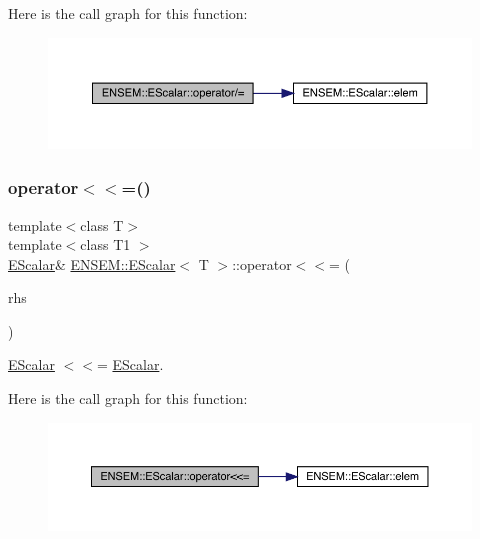 Here is the call graph for this function\+:
\nopagebreak
\begin{figure}[H]
\begin{center}
\leavevmode
\includegraphics[width=350pt]{d0/d82/classENSEM_1_1EScalar_a09524cf0f6f5baf9c421d03df58fe8d6_cgraph}
\end{center}
\end{figure}
\mbox{\label{classENSEM_1_1EScalar_a29ea96dc5698e4541307d65a0f1dfe6e}} 
\subsubsection{\texorpdfstring{operator$<$$<$=()}{operator<<=()}\hspace{0.1cm}{\footnotesize\ttfamily [1/2]}}
{\footnotesize\ttfamily template$<$class T$>$ \\
template$<$class T1 $>$ \\
\mbox{\hyperlink{classENSEM_1_1EScalar}{E\+Scalar}}\& \mbox{\hyperlink{classENSEM_1_1EScalar}{E\+N\+S\+E\+M\+::\+E\+Scalar}}$<$ T $>$\+::operator$<$$<$= (\begin{DoxyParamCaption}\item[{const \mbox{\hyperlink{classENSEM_1_1EScalar}{E\+Scalar}}$<$ T1 $>$ \&}]{rhs }\end{DoxyParamCaption})\hspace{0.3cm}{\ttfamily [inline]}}



\mbox{\hyperlink{classENSEM_1_1EScalar}{E\+Scalar}} $<$$<$= \mbox{\hyperlink{classENSEM_1_1EScalar}{E\+Scalar}}. 

Here is the call graph for this function\+:
\nopagebreak
\begin{figure}[H]
\begin{center}
\leavevmode
\includegraphics[width=350pt]{d0/d82/classENSEM_1_1EScalar_a29ea96dc5698e4541307d65a0f1dfe6e_cgraph}
\end{center}
\end{figure}
\mbox{\label{classENSEM_1_1EScalar_a29ea96dc5698e4541307d65a0f1dfe6e}} 

